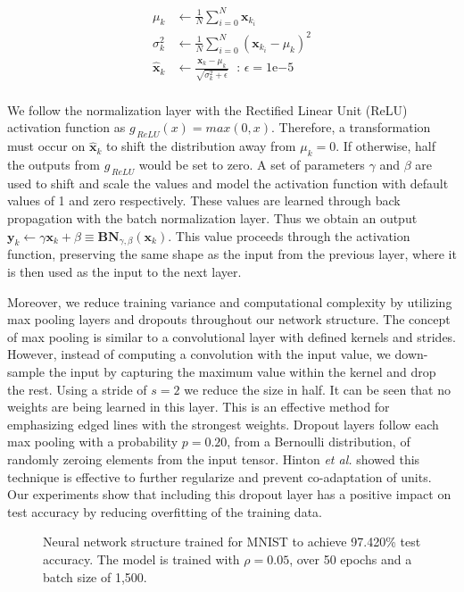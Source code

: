 \documentclass[conference]{IEEEtran}
\newcommand{\xv}{\mathbf{x}}
\newcommand{\yv}{\mathbf{y}}
\newcommand{\Bv}{\mathbf{B}}
\newcommand{\Nv}{\mathbf{N}}
\begin{document}
\begin{align*}
    \mu_k &\leftarrow \frac{1}{N} \sum_{i=0}^N{\xv_{k_i}} \\
    \sigma^2_k &\leftarrow \frac{1}{N} \sum_{i=0}^N{(\xv_{k_i} - \mu_k)^2} \\
    \hat{\xv}_k &\leftarrow \frac{\xv_k - \mu_k}{\sqrt{\sigma^2_k + \epsilon}} \; 
    \text{ : } \epsilon = 1\mathrm{e}{-5}\\
\end{align*}

\noindent
We follow the normalization layer with the Rectified Linear Unit (ReLU) activation function as $g_{\,ReLU}(x) = max(0, x)$. Therefore, a transformation must occur on $\hat{\xv}_k$ to shift the distribution away from $\mu_k = 0$. If otherwise, half the outputs from $g_{\,ReLU}$ would be set to zero. A set of parameters $\gamma$ and $\beta$ are used to shift and scale the values and model the activation function with default values of 1 and zero respectively. These values are learned through back propagation with the batch normalization layer. Thus we obtain an output $\yv_k \leftarrow \gamma \xv_k + \beta \equiv \Bv\Nv_{\gamma, \beta}(\xv_k)$. This value proceeds through the activation function, preserving the same shape as the input from the previous layer, where it is then used as the input to the next layer.

Moreover, we reduce training variance and computational complexity by utilizing max pooling layers and dropouts throughout our network structure. The concept of max pooling is similar to a convolutional layer with defined kernels and strides. However, instead of computing a convolution with the input value, we down-sample the input by capturing the maximum value within the kernel and drop the rest. Using a stride of $s = 2$ we reduce the size in half. It can be seen that no weights are being learned in this layer. This is an effective method for emphasizing edged lines with the strongest weights. Dropout layers follow each max pooling with a probability $p = 0.20$, from a Bernoulli distribution, of randomly zeroing elements from the input tensor. Hinton {\it et al.} \cite{hinton2012improving} showed this technique is effective to further regularize and prevent co-adaptation of units. Our experiments show that including this dropout layer has a positive impact on test accuracy by reducing overfitting of the training data. 

\begin{figure}[!b]
	\centering
	
	\captionsetup{width=0.90\linewidth}
	\caption{Neural network structure trained for MNIST to achieve 97.420\% test accuracy. The model is trained with $\rho = 0.05$, over 50 epochs and a batch size of 1,500.}
	\label{fig:mnist_network_structure}
\end{figure}
\end{document}
